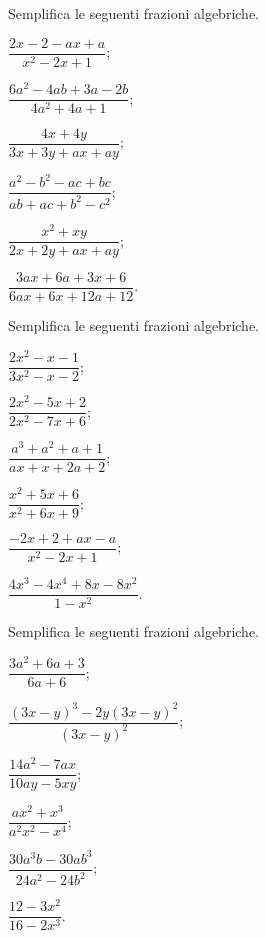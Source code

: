 \begin{esercizio}[\Ast]
\label{ese:14.5}
Semplifica le seguenti frazioni algebriche.
\begin{multicols}{3}
\begin{enumeratea}
 \item $\dfrac{2x-2-ax+a}{x^{2}-2x+1}$;
 \item $\dfrac{6a^{2}-4ab+3a-2b}{4a^{2}+4a+1}$;
 \item $\dfrac{4x+4y}{3x+3y+ax+ay}$;
 \item $\dfrac{a^{2}-b^{2}-ac+bc}{ab+ac+b^{2}-c^{2}}$;
 \item $\dfrac{x^{2}+xy}{2x+2y+ax+ay}$;
 \item $\dfrac{3ax+6a+3x+6}{6ax+6x+12a+12}$.
\end{enumeratea}
\end{multicols}
\end{esercizio}
\pagebreak
\begin{esercizio}[\Ast]
\label{ese:14.6}
Semplifica le seguenti frazioni algebriche.
\begin{multicols}{3}
\begin{enumeratea}
 \item $\dfrac{2x^{2}-x-1}{3x^{2}-x-2}$;
 \item $\dfrac{2x^{2}-5x+2}{2x^{2}-7x+6}$;
 \item $\dfrac{a^{3}+a^{2}+a+1}{ax+x+2a+2}$;
 \item $\dfrac{x^{2}+5x+6}{x^{2}+6x+9}$;
 \item $\dfrac{-2x+2+ax-a}{x^{2}-2x+1}$;
 \item $\dfrac{4x^{3}-4x^{4}+8x-8x^{2}}{1-x^{2}}$.
\end{enumeratea}
\end{multicols}
\end{esercizio}

\begin{esercizio}[\Ast]
\label{ese:14.7}
Semplifica le seguenti frazioni algebriche.
\begin{multicols}{2}
\begin{enumeratea}
 \item $\dfrac{3a^{2}+6a+3}{6a+6}$;
 \item $\dfrac{(3x-y)^{3}-2y(3x-y)^{2}}{(3x-y)^{2}}$;
 \item $\dfrac{14a^{2}-7ax}{10ay-5xy}$;
 \item $\dfrac{ax^{2}+x^{3}}{a^{2}x^{2}-x^{4}}$;
 \item $\dfrac{30a^{3}b-30ab^{3}}{24a^{2}-24b^{2}}$;
 \item $\dfrac{12-3x^{2}}{16-2x^{3}}$.
\end{enumeratea}
\end{multicols}
\end{esercizio}

